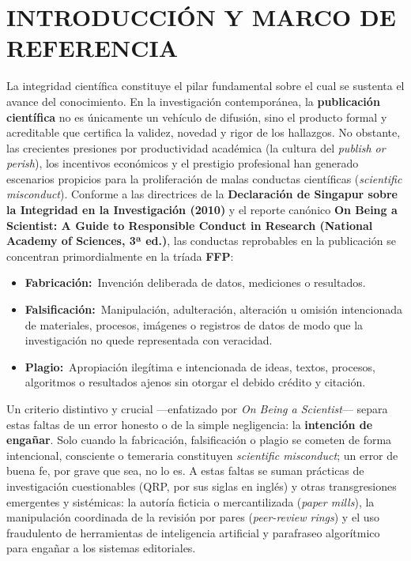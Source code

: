 \documentclass[12pt,a4paper]{article}
\newcommand{\itemlabel}[3]{\textbf{#1#2}~#3}
\let\oldsection\section
\renewcommand{\section}[1]{\needspace{5\baselineskip}\oldsection{#1}}
\begin{document}
\section{INTRODUCCIÓN Y MARCO DE REFERENCIA}
La integridad científica constituye el pilar fundamental sobre el cual se sustenta el avance del conocimiento. En la investigación contemporánea, la \textbf{publicación científica} no es únicamente un vehículo de difusión, sino el producto formal y acreditable que certifica la validez, novedad y rigor de los hallazgos. No obstante, las crecientes presiones por productividad académica (la cultura del \textit{\textquotedbl{}publish or perish\textquotedbl{}}), los incentivos económicos y el prestigio profesional han generado escenarios propicios para la proliferación de malas conductas científicas (\textit{scientific misconduct}).
Conforme a las directrices de la \textbf{Declaración de Singapur sobre la Integridad en la Investigación (2010)} \cite{wcri2010} y el reporte canónico \textbf{\textquotedbl{}On Being a Scientist: A Guide to Responsible Conduct in Research\textquotedbl{} (National Academy of Sciences, 3ª ed.)}, las conductas reprobables en la publicación se concentran primordialmente en la tríada \textbf{FFP}:
\begin{itemize}
\item \itemlabel{Fabricación}{:}{Invención deliberada de datos, mediciones o resultados.}
\item \itemlabel{Falsificación}{:}{Manipulación, adulteración, alteración u omisión intencionada de materiales, procesos, imágenes o registros de datos de modo que la investigación no quede representada con veracidad.}
\item \itemlabel{Plagio}{:}{Apropiación ilegítima e intencionada de ideas, textos, procesos, algoritmos o resultados ajenos sin otorgar el debido crédito y citación.}
\end{itemize}
Un criterio distintivo y crucial —enfatizado por \textit{On Being a Scientist}— separa estas faltas de un error honesto o de la simple negligencia: la \textbf{intención de engañar}. Solo cuando la fabricación, falsificación o plagio se cometen de forma intencional, consciente o temeraria constituyen \textit{scientific misconduct}; un error de buena fe, por grave que sea, no lo es.
A estas faltas se suman prácticas de investigación cuestionables (QRP, por sus siglas en inglés) y otras transgresiones emergentes y sistémicas: la autoría ficticia o mercantilizada (\textit{paper mills}), la manipulación coordinada de la revisión por pares (\textit{peer-review rings}) y el uso fraudulento de herramientas de inteligencia artificial y parafraseo algorítmico para engañar a los sistemas editoriales.
\end{document}
